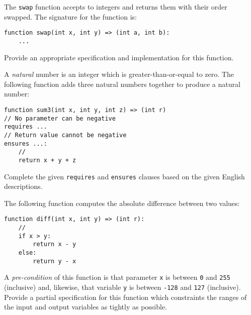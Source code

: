 \begin{ex}
The \lstinline{swap} function accepts to integers and returns them
with their order swapped.  The signature for the function is:
\begin{lstlisting}
function swap(int x, int y) => (int a, int b):
    ...
\end{lstlisting}
Provide an appropriate specification and implementation for this function.
\end{ex}

\begin{ex}

A {\em natural} number is an integer which is greater-than-or-equal to
zero.  The following function adds three natural numbers together to produce a natural number:
\begin{lstlisting}
function sum3(int x, int y, int z) => (int r)
// No parameter can be negative
requires ...
// Return value cannot be negative
ensures ...:
    //
    return x + y + z
\end{lstlisting}
Complete the given \lstinline{requires} and \lstinline{ensures}
clauses based on the given English descriptions.

\end{ex}

\begin{ex}
  The following function computes the absolute difference between two values:

\begin{lstlisting}
function diff(int x, int y) => (int r):
    //
    if x > y:
        return x - y
    else:
        return y - x
\end{lstlisting}

A {\em pre-condition} of this function is that parameter \lstinline{x}
is between \lstinline{0} and \lstinline{255} (inclusive) and,
likewise, that variable \lstinline{y} is between \lstinline{-128} and
\lstinline{127} (inclusive).  Provide a partial specification for
this function which constraints the ranges of the input and output
variables as tightly as possible.
\end{ex}

